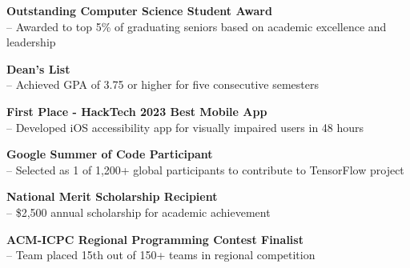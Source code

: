 \noindent\textbf{Outstanding Computer Science Student Award} \\
 -- Awarded to top 5\% of graduating seniors based on academic excellence and leadership

\vspace{0.3em}
\noindent\textbf{Dean's List} \\
 -- Achieved GPA of 3.75 or higher for five consecutive semesters

\vspace{0.3em}
\noindent\textbf{First Place - HackTech 2023 Best Mobile App} \\
 -- Developed iOS accessibility app for visually impaired users in 48 hours

\vspace{0.3em}
\noindent\textbf{Google Summer of Code Participant} \\
 -- Selected as 1 of 1,200+ global participants to contribute to TensorFlow project

\vspace{0.3em}
\noindent\textbf{National Merit Scholarship Recipient} \\
 -- \$2,500 annual scholarship for academic achievement

\vspace{0.3em}
\noindent\textbf{ACM-ICPC Regional Programming Contest Finalist} \\
 -- Team placed 15th out of 150+ teams in regional competition